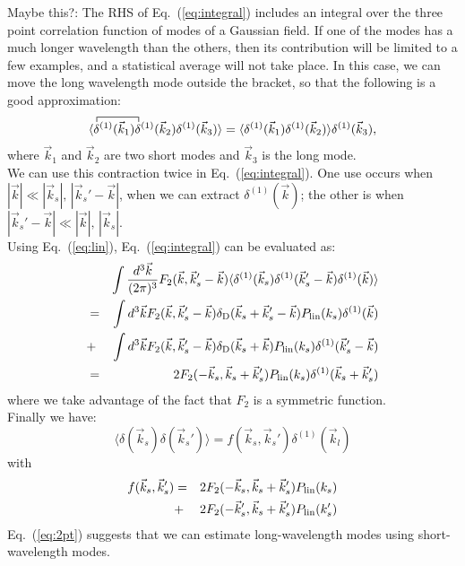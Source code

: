 \documentclass[prd,amsmath,amssymb,floatfix,superscriptaddress,nofootinbib,twocolumn]{revtex4-1}
\def\be{\begin{equation}}
\def\ee{\end{equation}}
\def\bea{\begin{eqnarray}}
\def\eea{\end{eqnarray}}
\newcommand{\vs}{\nonumber\\}
\newcommand{\vk}{\vec{k}}
\newcommand{\ec}[1]{Eq.~(\ref{eq:#1})}
\newcommand{\eql}[1]{\label{eq:#1}}
\newcommand{\RC}[1]{{\color{darkorange} #1}}
\begin{document}
\RC{Maybe this?: The RHS of \ec{integral} includes an integral over the three point correlation function of modes of a Gaussian field. If one of the modes has a much longer wavelength than the others, then its contribution will be limited to a few examples, and a statistical average will not take place.  In this case, we can move the long wavelength mode outside the bracket, so that the following is a good approximation:
\be 
\langle
\contraction{}{{\delta}}{{\delta^{(1)}\;\;\;\;}(}{}
{\delta^{(1)}}(\vk_{1}) {\delta^{(1)}}(\vk_{2}){\delta^{(1)}}(\vk_3) 
\rangle
=\langle {\delta^{(1)}}(\vk_{1}) {\delta^{(1)}}(\vk_{2}) \rangle {\delta^{(1)}}(\vk_3)  \eql{contraction},
\ee 
where $\vk_1$ and $\vk_2$ are two short modes and $\vk_3$ is the long mode.}\\
We can use this contraction twice in \ec{integral}. One use occurs when $|\vk| \ll |\vk_s|,\, |\vk_s'-\vk|$, when we can extract ${\delta}^{(1)}(\vk)$; the other is when $|\vk_s'-\vk| \ll |\vk|,\,|\vk_s|$.\\
Using \ec{lin}, \ec{integral} can be evaluated as:
\bea 
&&\int \frac{d^3\vec{k}}{(2\pi)^3} F_2 (\vec{k},\vec{k}_s'-\vec{k})\langle {\delta}^{(1)}(\vec{k}_s){\delta}^{(1)}(\vec{k}_s'-\vec{k}){\delta}^{(1)}(\vec{k}) \rangle \vs
&=&\int d^3\vk F_2(\vec{k},\vec{k}_s'-\vec{k}) \delta_{\rm D}(\vk_s+\vk_s'-\vk)P_{\rm lin}(k_s){\delta}^{(1)}(\vec{k}) \vs
&+&\int d^3\vk F_2(\vec{k},\vec{k}_s'-\vec{k}) \delta_{\rm D}(\vk_s+\vk)P_{\rm lin}(k_s){\delta}^{(1)}(\vk_s'-\vk) \vs
&=&2F_2(-\vk_s,\vk_s+\vk_s')P_{\rm lin}(k_s){\delta}^{(1)}(\vk_s+\vk_s')
\eea 
where we take advantage of the fact that $F_2$ is a symmetric function.\\
Finally we have:
\be 
\langle {\delta}(\vec{k}_s){\delta}(\vec{k}_s') \rangle =f(\vec{k}_s,\vec{k}_s'){\delta}^{(1)}(\vec{k}_l) \eql{2pt}
\ee 
with
\bea
f(\vec{k}_s,\vec{k}_s')&=&2F_2(-\vec{k}_s,\vec{k}_s+\vec{k}_s')P_{\rm lin}(k_s)\vs
&+&2F_2(-\vec{k}_s',\vec{k}_s+\vec{k}_s')P_{\rm lin}(k_s')       
\eea 
\ec{2pt} suggests that we can estimate long-wavelength modes using short-wavelength modes.
\end{document}
